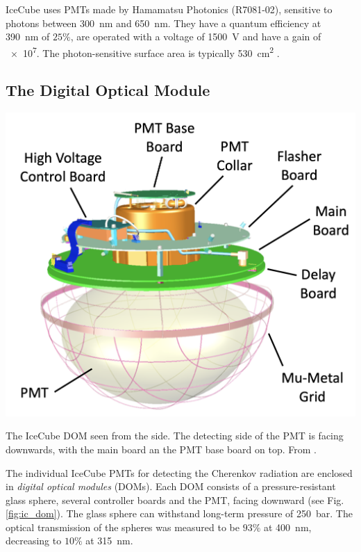 \documentclass[
    a4paper, %
    fontsize=10pt, %
    twoside=true, %
    numbers=noenddot, %
    fontmethod=tex, %
]{kaobook}
\begin{document}
IceCube uses PMTs made by Hamamatsu Photonics (R7081-02), sensitive to photons between \SI{300}{\nm} and \SI{650}{\nm}. They have a quantum efficiency at \SI{390}{\nm} of $25\%$, are operated with a voltage of \SI{1500}{\V} and have a gain of \num{e7}. The photon-sensitive surface area is typically \SI{530}{\cm\squared} .

\subsection*{The Digital Optical Module}
\begin{marginfigure}
    \includegraphics{ic_DOM.png}
    \caption[IceCube digital optical module]{The IceCube DOM seen from the side. The detecting side of the PMT is facing downwards, with the main board an the PMT base board on top. From \cite{Aartsen2017}.}
\end{marginfigure}
The individual IceCube PMTs for detecting the Cherenkov radiation are enclosed in \textit{digital optical modules} (DOMs). Each DOM consists of a pressure-resistant glass sphere, several controller boards and the PMT, facing downward (see Fig. \ref{fig:ic_dom}). The glass sphere can withstand long-term pressure of \SI{250}{\bar}. The optical transmission of the spheres was measured to be $93\%$ at \SI{400}{\nm}, decreasing to $10\%$ at \SI{315}{\nm}.
\end{document}

